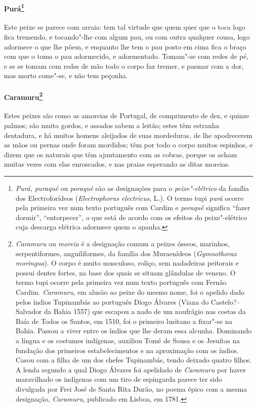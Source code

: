 \paragraph{Purá\footnote{ \textit{Purá, puraquê} ou
\textit{poraquê} são as designações para o \textit{peixe"-elétrico}
da família dos Electroforídeos (\textit{Electrophorus electricus}, L.).
O termo tupi \textit{purá} ocorre pela primeira vez num texto
português com Cardim e \textit{poraquê} significa ``fazer dormir'',
``entorpecer'', o que está de acordo com os efeitos do peixe"-elétrico
cuja descarga elétrica adormece quem o apanha.}} Este peixe
se parece com arraia: tem tal virtude que quem quer que o toca logo
fica tremendo, e tocando"-lhe com algum pau, ou com outra qualquer
cousa, logo adormece o que lhe põem, e enquanto lhe tem o pau posto em
cima fica o braço com que o toma o pau adormecido, e adormentado.
Tomam"-se com redes de pé, e se se tomam com redes de mão todo o corpo
faz tremer, e pasmar com a dor, mas morto come"-se, e não tem peçonha.

\paragraph{Caramuru\footnote{ \textit{Caramuru} ou \textit{moreia} é a
designação comum a peixes ósseos, marinhos, serpentiformes,
anguiliformes, da família dos Muraenídeos (\textit{Gymnothorax
moringua}). O corpo é muito musculoso, roliço, sem nadadeiras peitorais
e possui dentes fortes, na base dos quais se situam glândulas de
veneno. O termo tupi ocorre pela primeira vez num texto português com
Fernão Cardim. \textit{Caramuru}, em alusão ao peixe do mesmo nome, foi
o apelido dado pelos índios Tupinambás ao português Diogo Álvares (Viana
do Castelo?--Salvador da Bahia 1557) que escapou a nado de um
naufrágio nas costas da Baía de Todos os Santos, em 1510, foi o
primeiro lusitano a fixar"-se na Bahia. Passou a viver entre os índios
que lhe deram essa alcunha. Dominando a língua e os costumes indígenas,
auxiliou Tomé de Sousa e os Jesuítas na fundação dos primeiros
estabelecimentos e na aproximação com os índios. Casou com a filha de
um dos chefes Tupinambás, tendo deixado quatro filhos. A lenda segundo a
qual Diogo Álvares foi apelidado de \textit{Caramuru} por haver
maravilhado os indígenas com um tiro de espingarda parece ter sido
divulgada por Frei José de Santa Rita Durão, no poema épico com a mesma
designação, \textit{Caramuru}, publicado em Lisboa, em 1781.}} 
Estes peixes são como as amoreias de Portugal, de comprimento de dez,
e quinze palmos; são muito gordos, e assados sabem a leitão; estes têm
estranha dentadura, e há muitos homens aleijados de suas mordeduras, de
lhe apodrecerem as mãos ou pernas onde foram mordidos; têm por todo o
corpo muitos espinhos, e dizem que os naturais que têm ajuntamento com
as cobras, porque os acham muitas vezes com elas enroscados, e nas
praias esperando as ditas moreias.

